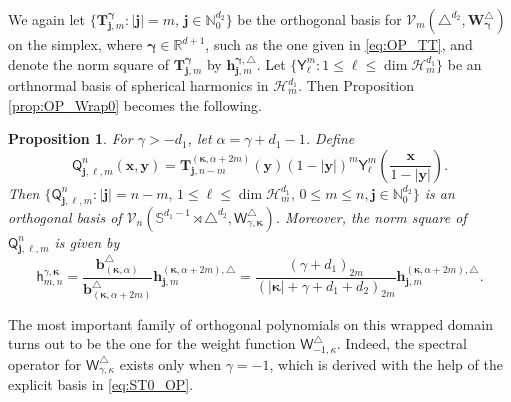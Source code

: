 \documentclass{amsart}
\newtheorem{prop}[thm]{Proposition}
\theoremstyle{remark}
\def\la{{\langle}}
\def\ra{{\rangle}}
\def\sh{{\mathsf h}}
\def\sQ{{\mathsf Q}}
\def\sW{{\mathsf W}}
\def\sY{{\mathsf Y}}
\def\a{{\alpha}}
\def\g{{\gamma}}
\def\k{{\kappa}}
\def\la{{\langle}}
\def\ra{{\rangle}}
\def\Wb{{\bm W}}
\def\CH{{\mathcal H}}
\def\CV{{\mathcal V}}
\def\NN{{\mathbb N}}
\def\RR{{\mathbb R}}
\def\SS{{\mathbb S}}
\def\VV{{\mathbb V}}
\def\bg{{\boldsymbol{\gamma}}}
\def\bk{{\boldsymbol{\kappa}}}
\begin{document}
We again let $\{\bm T_{\bm j, m}^{\bg}: |\bm j| = m, \, \bm j\in \NN_0^{d_2}\}$ be the orthogonal basis for 
$\CV_{m}\left(\triangle^{d_2}, \Wb_{\bg}^\triangle\right)$ on the simplex, where $\bg \in \RR^{d+1}$, 
such as the one given in \eqref{eq:OP_TT}, and denote the norm square of $\bm T_{\bm j, m}^{\bg}$ 
by $\bm h_{\bm j,m}^{\bg,\triangle}$. 
Let $\{\sY_\ell^m: 1 \le \ell \le  \dim \CH_m^{d_1}\}$ be an orthnormal basis of spherical harmonics in 
$\CH_m^{d_1}$. Then Proposition \ref{prop:OP_Wrap0} becomes the following. 

\begin{prop}
For $\g > - d_1$, let $\a = \g + d_1 -1$. Define %
\begin{equation} \label{eq:ST0_OP}
 \sQ_{\bm j, \ell, m}^n(\bm x,\bm y) = \bm T_{\bm j, n-m}^{(\bk, \alpha+2m)}(\bm y) (1-|\bm y|)^m 
      \sY_{\ell}^m \left(\frac{\bm x}{1-|\bm y|}\right). 
\end{equation}
Then $\{\sQ_{\bm j, \ell, m}^n: |\bm j| = n-m, \, 1 \le \ell \le \dim \CH_m^{d_1}, \, 0 \le m  \le n, \bm j \in \NN_0^{d_2}\}$ 
is an orthogonal basis of $\CV_n(\SS^{d_1-1}\!\! \rtimes \triangle^{d_2}, \sW_{\g, \bk}^\triangle)$. Moreover, 
the norm square of $\sQ_{\bm j, \ell, m}^n$ 
is given by 
\begin{equation} \label{eq:ST0_Norm}
   \sh_{m,n}^{\g,\bk}  %
       =   \frac{\bm b^\triangle_{(\bk,\alpha)}}{\bm b^\triangle_{(\bk, \alpha + 2m)}} \bm h_{\bm j,m}^{(\bk, \a+ 2m), \triangle}
       = \frac{(\g +d_1)_{2m}} {(|\bk|+ \g + d_1 + d_2)_{2m}} \bm h_{\bm j,m}^{(\bk, \a+ 2m), \triangle}.  
\end{equation}
\end{prop}
 
The most important family of orthogonal polynomials on this wrapped domain turns out to be the one for the weight function
$\sW_{-1,\k}^\triangle$. Indeed, the spectral operator for $\sW_{\g,\k}^\triangle$ exists only when $\g = -1$, which is 
derived with the help of the explicit basis in \eqref{eq:ST0_OP}. 
\end{document}
